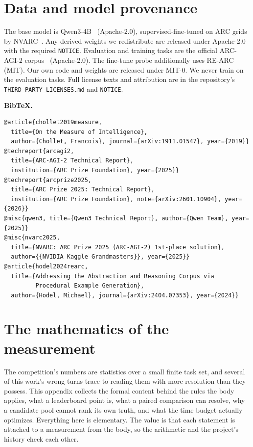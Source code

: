 \documentclass[11pt]{article}
\begin{document}
\section{Data and model provenance}
\label{app:prov}
The base model is Qwen3-4B~\cite{qwen3} (Apache-2.0), supervised-fine-tuned on ARC grids by
NVARC~\cite{nvarc}. Any derived weights we redistribute are released under Apache-2.0 with the
required \texttt{NOTICE}. Evaluation and training tasks are the official ARC-AGI-2 corpus~\cite{arcagi2}
(Apache-2.0). The fine-tune probe additionally uses RE-ARC~\cite{rearc} (MIT). Our own code and
weights are released under MIT-0. We never train on the evaluation tasks. Full license texts and
attribution are in the repository's \texttt{THIRD\_PARTY\_LICENSES.md} and \texttt{NOTICE}.

\medskip
\noindent\textbf{BibTeX.}
{\footnotesize
\begin{verbatim}
@article{chollet2019measure,
  title={On the Measure of Intelligence},
  author={Chollet, Francois}, journal={arXiv:1911.01547}, year={2019}}
@techreport{arcagi2,
  title={ARC-AGI-2 Technical Report},
  institution={ARC Prize Foundation}, year={2025}}
@techreport{arcprize2025,
  title={ARC Prize 2025: Technical Report},
  institution={ARC Prize Foundation}, note={arXiv:2601.10904}, year={2026}}
@misc{qwen3, title={Qwen3 Technical Report}, author={Qwen Team}, year={2025}}
@misc{nvarc2025,
  title={NVARC: ARC Prize 2025 (ARC-AGI-2) 1st-place solution},
  author={{NVIDIA Kaggle Grandmasters}}, year={2025}}
@article{hodel2024rearc,
  title={Addressing the Abstraction and Reasoning Corpus via
         Procedural Example Generation},
  author={Hodel, Michael}, journal={arXiv:2404.07353}, year={2024}}
\end{verbatim}
}

\section{The mathematics of the measurement}
\label{app:math}

The competition's numbers are statistics over a small finite task set, and several of this work's wrong
turns trace to reading them with more resolution than they possess. This appendix collects the formal
content behind the rules the body applies, what a leaderboard point is, what a paired comparison can
resolve, why a candidate pool cannot rank its own truth, and what the time budget actually optimizes.
Everything here is elementary. The value is that each statement is attached to a measurement from the
body, so the arithmetic and the project's history check each other.
\end{document}
